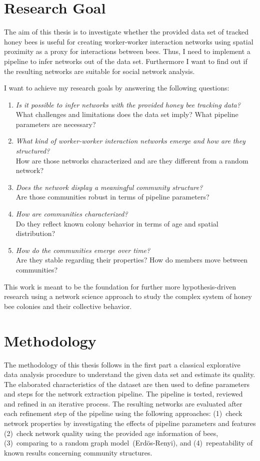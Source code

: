 \section{Research Goal}

The aim of this thesis is to investigate whether the provided data set of tracked honey bees is useful for creating worker-worker interaction networks using spatial proximity as a proxy for interactions between bees. Thus, I need to implement a pipeline to infer networks out of the data set. Furthermore I want to find out if the resulting networks are suitable for social network analysis.

I want to achieve my research goals by answering the following questions:

\begin{enumerate}
\item \emph{Is it possible to infer networks with the provided honey bee tracking data?}\\
What challenges and limitations does the data set imply? What pipeline parameters are necessary?
\item \emph{What kind of worker-worker interaction networks emerge and how are they structured?}\\
How are those networks characterized and are they different from a random network?
\item \emph{Does the network display a meaningful community structure?}\\
Are those communities robust in terms of pipeline parameters?
\item \emph{How are communities characterized?}\\
Do they reflect known colony behavior in terms of age and spatial distribution?
\item \emph{How do the communities emerge over time?}\\
Are they stable regarding their properties? How do members move between communities?
\end{enumerate}

This work is meant to be the foundation for further more hypothesis-driven research using a network science approach to study the complex system of honey bee colonies and their collective behavior.

\section{Methodology}
The methodology of this thesis follows in the first part a classical explorative data analysis procedure to understand the given data set and estimate its quality. The elaborated characteristics of the dataset are then used to define parameters and steps for the network extraction pipeline. The pipeline is tested, reviewed and refined in an iterative process. The resulting networks are evaluated after each refinement step of the pipeline using the following approaches: (1)~check network properties by investigating the effects of pipeline parameters and features (2)~check network quality using the provided age information of bees, (3)~comparing to a random graph model~(Erdös-Renyi), and (4)~repeatability of known results concerning community structures.

